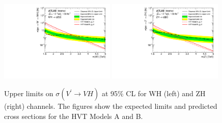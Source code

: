 \begin{figure}[htbp!]
    \begin{center}
        \includegraphics[width=0.49\textwidth]{VHqqbbLimitATLAS_WH.pdf}
        \includegraphics[width=0.49\textwidth]{VHqqbbLimitATLAS_ZH.pdf}
    \end{center}
    \caption{Upper limits on $\sigma(V^\prime \rightarrow VH)$ at 95\% CL for WH (left) and ZH (right) channels.
        The figures show the expected limits and predicted cross sections for the HVT Models A and B.
    }
    \label{fig:exp_limits_atlas}
\end{figure}


